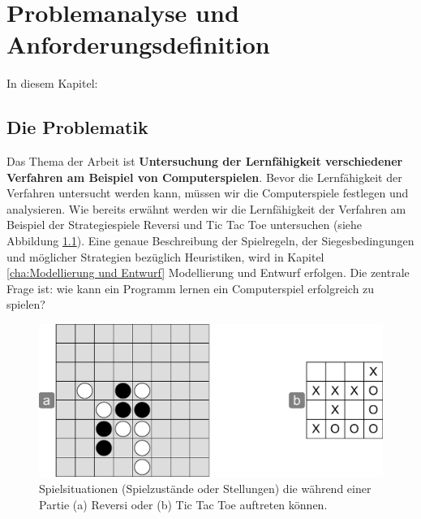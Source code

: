 \chapter{Problemanalyse und Anforderungsdefinition}
\label{cha:pua}

In diesem Kapitel: 

\section{Die Problematik}
Das Thema der Arbeit ist \textbf{Untersuchung der Lernfähigkeit verschiedener Verfahren am Beispiel von Computerspielen}. Bevor die Lernfähigkeit der Verfahren untersucht werden kann, müssen wir die Computerspiele festlegen und analysieren. Wie bereits erwähnt werden wir die Lernfähigkeit der Verfahren am Beispiel der Strategiespiele Reversi und Tic Tac Toe untersuchen (siehe Abbildung \ref{fig:reversi_und_tictactoe}). Eine genaue Beschreibung der Spielregeln, der Siegesbedingungen und möglicher Strategien bezüglich Heuristiken, wird in Kapitel \ref{cha:Modellierung und Entwurf} Modellierung und Entwurf erfolgen. Die zentrale Frage ist: wie kann ein Programm lernen ein Computerspiel erfolgreich zu spielen? \\

\begin{figure}[!htbp]
  \centering
  \includegraphics[scale = 0.6]{inhalt/abbildungen/reversi_und_tictactoe.pdf}
  \caption{Spielsituationen (Spielzustände oder Stellungen) die während einer Partie (a) Reversi oder (b) Tic Tac Toe auftreten können.}
  \label{fig:reversi_und_tictactoe}
\end{figure} 

